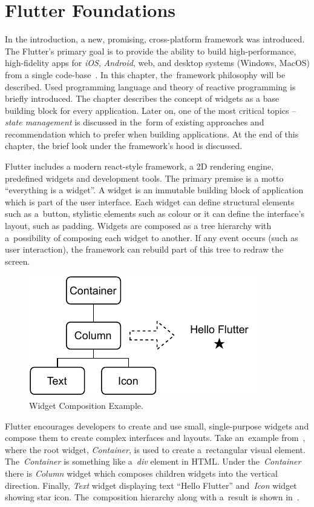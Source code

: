 \chapter{Flutter Foundations}
\label{ch:flutter}
In the introduction, a new, promising, cross-platform framework was introduced. The Flutter's primary goal is to provide the ability to build high-performance, high-fidelity apps for \textit{iOS}, \textit{Android}, web, and desktop systems (Windows, MacOS) from a single code-base~\cite{flutter-technical-overview}. In this chapter, the~framework philosophy will be described. Used programming language and theory of reactive programming is briefly introduced. The chapter describes the concept of widgets as a base building block for every application. Later on, one of the most critical topics -- \textit{state management} is discussed in the~form of existing approaches and recommendation which to prefer when building applications. At the end of this chapter, the brief look under the framework's hood is discussed.

Flutter includes a modern react-style framework, a 2D rendering engine, predefined widgets and development tools. The primary premise is a motto ``everything is a widget''. A widget is an immutable building block of application which is part of the user interface. Each widget can define structural elements such as a~button, stylistic elements such as colour or it can define the interface's layout, such as padding. Widgets are composed as a tree hierarchy with a~possibility of composing each widget to another. If any event occurs (such as user interaction), the framework can rebuild part of this tree to redraw the screen.  

\begin{figure}[htp]
    \centering
    \includegraphics[width=0.5\linewidth]{img/flutter/hello-flutter.pdf}
    \caption{Widget Composition Example.}
    \label{fig:hello-flutter}
\end{figure}

Flutter encourages developers to create and use small, single-purpose widgets and compose them to create complex interfaces and layouts. Take an~example from~, where the root widget, \textit{Container}, is used to create a~rectangular visual element. The~\textit{Container} is something like a~\textit{div} element in HTML. Under the~\textit{Container} there is \textit{Column} widget which composes children widgets into the vertical direction. Finally, \textit{Text} widget displaying text ``Hello Flutter'' and~\textit{Icon} widget showing star icon. The~composition hierarchy along with a~result is shown in~.

